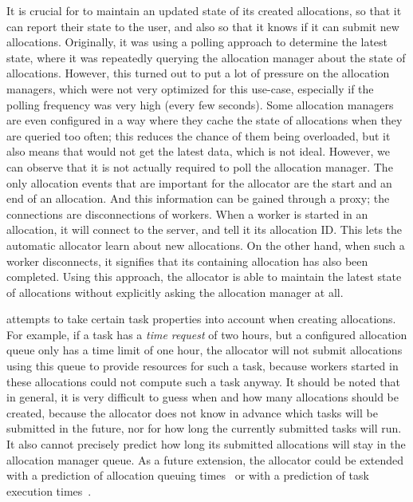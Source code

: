 It is crucial for \autoalloc{} to maintain an updated state of its created allocations,
so that it can report their state to the user, and also so that it knows if it can submit new
allocations. Originally, it was using a polling approach to determine the latest state, where it
was repeatedly querying the allocation manager about the state of allocations. However, this turned
out to put a lot of pressure on the allocation managers, which were not very optimized for this
use-case, especially if the polling frequency was very high (every few seconds). Some allocation
managers are even configured in a way where they cache the state of allocations when they are
queried too often; this reduces the chance of them being overloaded, but it also means that
\hyperqueue{} would not get the latest data, which is not ideal. However, we can observe
that it is not actually required to poll the allocation manager. The only allocation events that
are important for the allocator are the start and an end of an allocation. And this information can
be gained through a proxy; the connections are disconnections of \hq{} workers.
When a worker is started in an allocation, it will connect to the server, and tell it its
allocation ID\@. This lets the automatic allocator learn about new allocations. On the other hand,
when such a worker disconnects, it signifies that its containing allocation has also been
completed. Using this approach, the allocator is able to maintain the latest state of allocations
without explicitly asking the allocation manager at all.

\Autoalloc{} attempts to take certain task properties into account when creating
allocations. For example, if a task has a \emph{time request} of two hours, but a configured
allocation queue only has a time limit of one hour, the allocator will not submit allocations using
this queue to provide resources for such a task, because workers started in these allocations could
not compute such a task anyway. It should be noted that in general, it is very difficult to guess
when and how many allocations should be created, because the allocator does not know in advance
which tasks will be submitted in the future, nor for how long the currently submitted tasks will
run. It also cannot precisely predict how long its submitted allocations will stay in the
allocation manager queue. As a future extension, the allocator could be extended with a prediction
of allocation queuing times~\cite{allocation-duration-prediction} or with a prediction of task execution
times~\cite{task-duration-prediction}.

